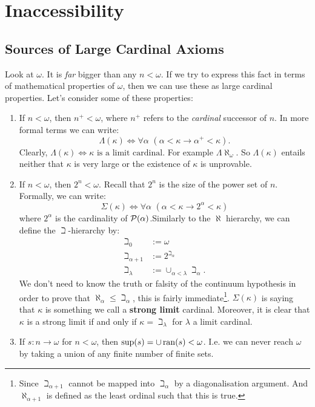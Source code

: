 \documentclass{article}
\begin{document}
\section{Inaccessibility}
\subsection{Sources of Large Cardinal Axioms}
Look at $\omega$. It is \textit{far} bigger than any $n < \omega$. If we try to express this fact in terms of mathematical properties of $\omega$, then we can use these as large cardinal properties. Let's consider some of these properties: \begin{enumerate}
    \item If $n < \omega$, then $n^{+} < \omega$, where $n^{+}$ refers to the \textit{cardinal} successor of $n$. In more formal terms we can write: \[ \Lambda(\kappa) \Leftrightarrow \forall \alpha\, \, (\alpha < \kappa \rightarrow \alpha^{+} < \kappa).\] Clearly, $\Lambda(\kappa) \Leftrightarrow \text{$\kappa$ is a limit cardinal}$. For example $\Lambda{\aleph_{\omega}}$. So $\Lambda(\kappa)$ entails neither that $\kappa$ is very large or the existence of $\kappa$ is unprovable.
    \item If $n< \omega$, then $2^{n} < \omega$. Recall that $2^{n}$ is the size of the power set of $n$. Formally, we can write: \[ \Sigma(\kappa) \Leftrightarrow \forall \alpha \,\, (\alpha < \kappa \rightarrow 2^{\alpha} < \kappa)\] where $2^{\alpha}$ is the cardinality of $\mathcal{P}(\alpha)$.\gap Similarly to the $\aleph$ hierarchy, we can define the $\beth$-hierarchy by: \begin{align*}
        \beth_{0} &:= \omega\\
        \beth_{\alpha+1} &:= 2^{\beth_{\alpha}}\\
        \beth_{\lambda} &:= \cup_{\alpha < \lambda} \beth_{\alpha}.
    \end{align*}
    We don't need to know the truth or falsity of the continuum hypothesis in order to prove that $\aleph_{\alpha} \leq \beth_{\alpha}$, this is fairly immediate\footnote{Since $\beth_{\alpha+1}$ cannot be mapped into $\beth_{\alpha}$ by a diagonalisation argument. And $\aleph_{\alpha+1}$ is defined as the least ordinal such that this is true.}.\gap 
    $\Sigma(\kappa)$ is saying that $\kappa$ is something we call a \textbf{strong limit} cardinal. Moreover, it is clear that $\kappa$ is a strong limit if and only if $\kappa = \beth_{\lambda}$ for $\lambda$ a limit cardinal.
    \item If $s : n \to \omega$ for $n < \omega$, then $ \sup(s) = \cup \operatorname{ran}(s) < \omega$. I.e. we can never reach $\omega$ by taking a union of any finite number of finite sets.

\end{enumerate}
\end{document}
